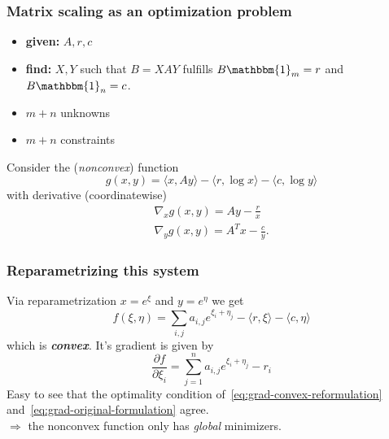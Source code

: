 \documentclass{beamer}
\begin{document}
\begin{frame}
  \frametitle{Matrix scaling as an optimization problem}
  \begin{itemize}
    \item \textbf{given:} $A, r, c$
    \item \textbf{find:} $X, Y$ such that $B=XAY$ fulfills $B\mathbbm{1}_m=r$ and $B \mathbbm{1}_n=c$.
    \item $m+n$ unknowns
          \item $m+n$ constraints
  \end{itemize}
  Consider the (\emph{nonconvex}) function
  \begin{equation}
    g(x,y) = \langle x, A y \rangle - \langle r, \log x \rangle - \langle c, \log y \rangle
  \end{equation}
  with derivative (coordinatewise)
  \begin{equation}
    \label{eq:grad-original-formulation}
    \begin{aligned}
      \nabla_x g(x,y) = Ay - \frac{r}{x} \\
      \nabla_y g(x,y) = A^T x - \frac{c}{y}.
    \end{aligned}
  \end{equation}
\end{frame}


\begin{frame}
  \frametitle{Reparametrizing this system}
  Via reparametrization $x= e^\xi$ and $y=e^{\eta}$ we get
  \begin{equation}
    f(\xi, \eta) = \sum_{i,j} a_{i,j} e^{\xi_i + \eta_j} - \langle r, \xi \rangle - \langle c, \eta \rangle
  \end{equation}
  which is \textbf{\emph{convex}}. It's gradient is given by
  \begin{equation}
    \label{eq:grad-convex-reformulation}
    \frac{\partial f}{\partial \xi_i} = \sum_{j=1}^{n} a_{i,j} e^{\xi_i + \eta_j} - r_i
  \end{equation}
  Easy to see that the optimality condition of~\eqref{eq:grad-convex-reformulation} and~\eqref{eq:grad-original-formulation} agree.\\
  $\Rightarrow$ the nonconvex function only has \emph{global} minimizers.
\end{frame}
\end{document}
